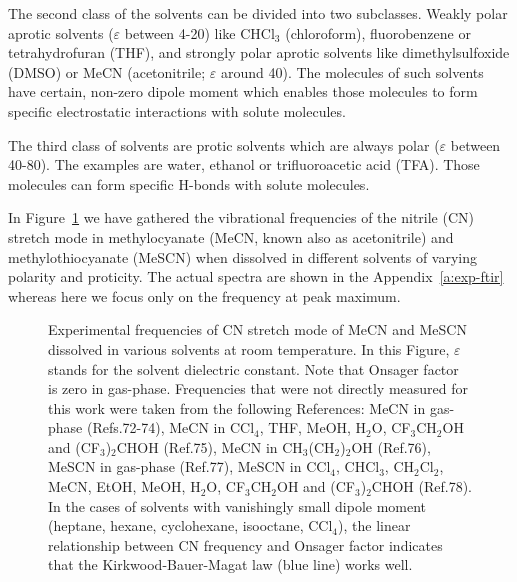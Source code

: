 \documentclass[a4paper,titlepage,twoside,fleqn,12pt]{book}
\begin{document}
\begin{refsection}
The second class of the solvents can be divided into two subclasses. 
Weakly polar aprotic solvents ($\varepsilon$ between 4-20) 
like CHCl$_3$ (chloroform), fluorobenzene or tetrahydrofuran (THF), 
and strongly polar aprotic solvents like dimethylsulfoxide (DMSO) 
or MeCN (acetonitrile; $\varepsilon$ around 40).
The molecules of such solvents have certain, non-zero dipole moment 
which enables those molecules to form specific electrostatic interactions with 
solute molecules.

The third class of solvents are protic solvents which are always polar 
($\varepsilon$ between 40-80). The examples are water, ethanol or trifluoroacetic acid (TFA).
Those molecules can form specific H-bonds with solute molecules. 

In Figure~\ref{f.MeCN.MeSCN.vs.solvents} we have gathered the vibrational 
frequencies of the nitrile (CN) stretch mode in methylocyanate (MeCN, known also as acetonitrile) and methylothiocyanate
(MeSCN) when dissolved in different solvents of varying polarity and proticity.\citep{Blasiak.Ritchie.Webb.Cho.XXX.2016}
The actual spectra are shown in the Appendix~\ref{a:exp-ftir} whereas here we focus only
on the frequency at peak maximum.
%
\begin{figure}[ht]
\centering
\setlength\fboxsep{0.4pt}
\setlength\fboxrule{0.5pt}
\caption{Experimental frequencies of CN stretch mode of MeCN and MeSCN dissolved in
various solvents at room temperature. In this Figure, $\varepsilon$
stands for the solvent dielectric constant. Note that Onsager factor is zero in gas-phase. 
Frequencies that were not directly measured for this work were taken from the following 
References: MeCN in gas-phase (Refs.72-74), MeCN in CCl$_4$, THF, MeOH, H$_2$O, CF$_3$CH$_2$OH and 
(CF$_3$)$_2$CHOH (Ref.75), MeCN in CH$_3$(CH$_2$)$_2$OH (Ref.76), MeSCN in gas-phase (Ref.77), MeSCN in 
CCl$_4$, CHCl$_3$, CH$_2$Cl$_2$, MeCN, EtOH, MeOH, H$_2$O, CF$_3$CH$_2$OH and (CF$_3$)$_2$CHOH (Ref.78). In the 
cases of solvents with vanishingly small dipole moment (heptane, hexane, cyclohexane, 
isooctane, CCl$_4$), the linear relationship between CN frequency and Onsager factor indicates that 
the Kirkwood-Bauer-Magat law (blue line) works well.
\label{f.MeCN.MeSCN.vs.solvents}}
\end{figure}
%


\end{refsection}
\end{document}
